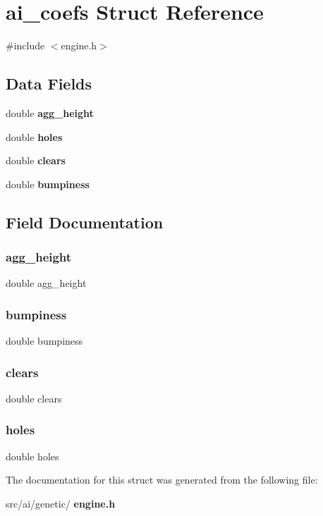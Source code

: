 \section{ai\+\_\+coefs Struct Reference}
\label{structai__coefs}


{\ttfamily \#include $<$engine.\+h$>$}

\subsection*{Data Fields}
\begin{DoxyCompactItemize}
\item 
double \textbf{ agg\+\_\+height}
\item 
double \textbf{ holes}
\item 
double \textbf{ clears}
\item 
double \textbf{ bumpiness}
\end{DoxyCompactItemize}


\subsection{Field Documentation}
\mbox{\label{structai__coefs_a0691df3d11342de203475e6993146f76}} 
\subsubsection{agg\+\_\+height}
{\footnotesize\ttfamily double agg\+\_\+height}

\mbox{\label{structai__coefs_a7a634ecd67e00fc4b19a86046ad95154}} 
\subsubsection{bumpiness}
{\footnotesize\ttfamily double bumpiness}

\mbox{\label{structai__coefs_a7e11e19ab08623daaac58bd77d5f80c4}} 
\subsubsection{clears}
{\footnotesize\ttfamily double clears}

\mbox{\label{structai__coefs_acf9e4d84dfc5d65f5a85fc4dc3a5fadb}} 
\subsubsection{holes}
{\footnotesize\ttfamily double holes}



The documentation for this struct was generated from the following file\+:\begin{DoxyCompactItemize}
\item 
src/ai/genetic/\textbf{ engine.\+h}\end{DoxyCompactItemize}
